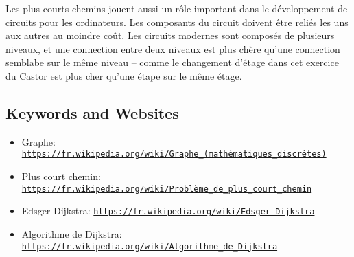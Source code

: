 \documentclass[a4paper,11pt]{report}
\newcommand{\BrochureUrlText}[1]{\texttt{#1}}
\begin{document}
Les plus courts chemins jouent aussi un rôle important dans le développement de circuits pour les ordinateurs. Les composants du circuit doivent être reliés les uns aux autres au moindre coût. Les circuits modernes sont composés de plusieurs niveaux, et une connection entre deux niveaux est plus chère qu’une connection semblabe sur le même niveau – comme le changement d’étage dans cet exercice du Castor est plus cher qu’une étape sur le même étage.

{\raggedright

\subsection*{Keywords and Websites}

\begin{itemize}
  \item Graphe: \href{https://fr.wikipedia.org/wiki/Graphe_(math\%C3\%A9matiques_discr\%C3\%A8tes)}{\BrochureUrlText{https://fr.wikipedia.org/wiki/Graphe\_(mathématiques\_discrètes)}}
  \item Plus court chemin: \href{https://fr.wikipedia.org/wiki/Probl\%C3\%A8me_de_plus_court_chemin}{\BrochureUrlText{https://fr.wikipedia.org/wiki/Problème\_de\_plus\_court\_chemin}}
  \item Edsger Dijkstra: \href{https://fr.wikipedia.org/wiki/Edsger_Dijkstra}{\BrochureUrlText{https://fr.wikipedia.org/wiki/Edsger\_Dijkstra}}
  \item Algorithme de Dijkstra: \href{https://fr.wikipedia.org/wiki/Algorithme_de_Dijkstra}{\BrochureUrlText{https://fr.wikipedia.org/wiki/Algorithme\_de\_Dijkstra}}
\end{itemize}


}
\end{document}
